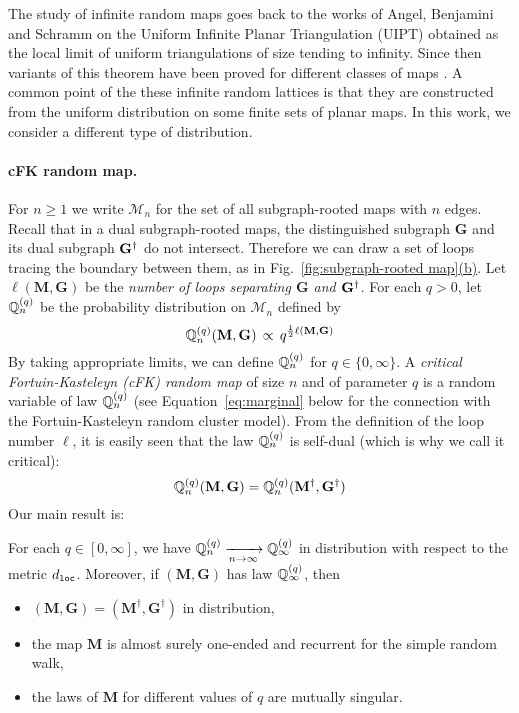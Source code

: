 \documentclass[a4paper]{article}
\newcommand{\refnote}[2]{\hyperref[#1]{\ref*{#1}#2}}
\newcommand*{\map}{\mathbf}
\newcommand*{\M}{\mathcal{M}}
\begin{document}
The study of infinite random maps goes back to the works of Angel, Benjamini and Schramm on the Uniform Infinite Planar Triangulation (UIPT) \cite{BS01,AS03} obtained as the local limit of uniform triangulations of size tending to infinity. Since then variants of this theorem have been proved for different classes of maps \cite{CD06,Kri06,Men10,CMM13,BS14}. A common point of the these infinite random lattices is that they are constructed from the uniform distribution on some finite sets of planar maps.
In this work, we consider a different type of distribution.


\paragraph{cFK random map.}
For $n \geq 1$ we write $\M_n$ for the set of all subgraph-rooted maps with $n$ edges. Recall that in a dual subgraph-rooted maps, the distinguished subgraph $\map{G}$ and its dual subgraph $\map{G}^\dual$ do not intersect.
Therefore we can draw a set of loops tracing the boundary between them, as in Fig.~\refnote{fig:subgraph-rooted map}{(b)}.
Let $\ell(\map{M,G})$ be the \emph{number of loops separating $\map{G}$ and $\map{G}^\dual$}.
For each $q>0$, let $\proba[Q]\ind{q}_n$ be the probability distribution on $\M_n$ defined by
\begin{equation}
	\proba[Q]\ind{q}_n(\map{M,G})\, \propto\, q^{\frac{1}{2}\ell(\map{M,G})}
\end{equation}
By taking appropriate limits, we can define $\proba[Q]\ind{q}_n$ for $q\in\{0,\infty\}$. A \emph{critical Fortuin-Kasteleyn (cFK) random map} of size $n$ and of parameter $q$ is a random variable of law $\proba[Q]\ind{q}_n$ (see Equation~\eqref{eq:marginal} below for the connection with the Fortuin-Kasteleyn random cluster model). From the definition of the loop number $\ell$, it is easily seen that the law $\proba[Q]\ind{q}_n$ is self-dual (which is why we call it critical):
\begin{equation}\label{eq:self dual}
	\proba[Q]\ind{q}_n(\map{M,G}) = \proba[Q]\ind{q}_n(\map{M^\dual,G^\dual})
\end{equation}
Our main result is:
\begin{thm}\label{thm:map limit}
For each $q\in[0,\infty]$,  we have $\proba[Q]\ind{q}_n \cvg{}{n\to\infty} \proba[Q]\ind{q}_\infty$ in distribution with respect to the metric $d\sub{loc}$.
Moreover, if $(\map{M},\map{G})$ has law $\proba[Q]\ind{q}_\infty$, then 
\begin{itemize}
\item $( \mathbf{M}, \mathbf{G}) = ( \mathbf{M}^\dagger,  \mathbf{G}^\dagger)$ in distribution,
\item the map $\map{M}$ is almost surely one-ended and recurrent for the simple random walk,
\item the laws of $\mathbf{M}$ for different values of $q$ are mutually singular.
\end{itemize}
\end{thm}
\end{document}
